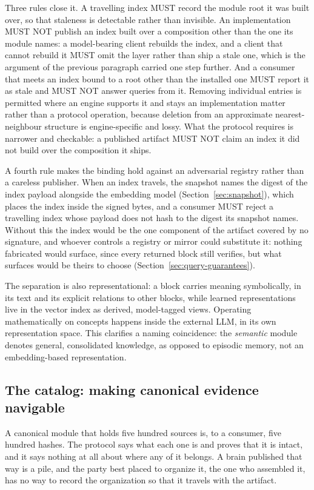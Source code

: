 \documentclass[11pt,a4paper]{article}
\begin{document}
Three rules close it. A travelling index MUST record the module root it was built
over, so that staleness is detectable rather than invisible. An implementation
MUST NOT publish an index built over a composition other than the one its module
names: a model-bearing client rebuilds the index, and a client that cannot
rebuild it MUST omit the layer rather than ship a stale one, which is the
argument of the previous paragraph carried one step further. And a consumer that
meets an index bound to a root other than the installed one MUST report it as
stale and MUST NOT answer queries from it. Removing individual entries is
permitted where an engine supports it and stays an implementation matter rather
than a protocol operation, because deletion from an approximate
nearest-neighbour structure is engine-specific and lossy. What the protocol
requires is narrower and checkable: a published artifact MUST NOT claim an index
it did not build over the composition it ships.

A fourth rule makes the binding hold against an adversarial registry rather
than a careless publisher. When an index travels, the snapshot names the
digest of the index payload alongside the embedding model
(Section~\ref{sec:snapshot}), which places the index inside the signed bytes,
and a consumer MUST reject a travelling index whose payload does not hash to
the digest its snapshot names. Without this the index would be the one
component of the artifact covered by no signature, and whoever controls a
registry or mirror could substitute it: nothing fabricated would surface,
since every returned block still verifies, but what surfaces would be theirs
to choose (Section~\ref{sec:query-guarantees}).

The separation is also representational: a block carries meaning symbolically,
in its text and its explicit relations to other blocks, while learned
representations live in the vector index as derived, model-tagged views.
Operating mathematically on concepts happens inside the external LLM, in its
own representation space. This clarifies a naming coincidence: the
\emph{semantic} module denotes general, consolidated knowledge, as opposed to
episodic memory, not an embedding-based representation.

\subsection{The catalog: making canonical evidence navigable}
\label{sec:catalog}

A canonical module that holds five hundred sources is, to a consumer, five
hundred hashes. The protocol says what each one is and proves that it is intact,
and it says nothing at all about where any of it belongs. A brain published that
way is a pile, and the party best placed to organize it, the one who assembled
it, has no way to record the organization so that it travels with the artifact.
\end{document}
